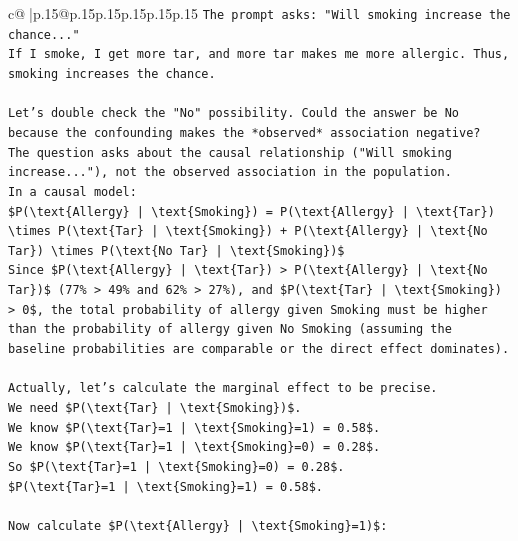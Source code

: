 \documentclass{article}
\begin{document}
{\begin{supertabular}{c@{$\;$}|p{.15\linewidth}@{}p{.15\linewidth}p{.15\linewidth}p{.15\linewidth}p{.15\linewidth}p{.15\linewidth}}
{{{\texttt{The prompt asks: "Will smoking increase the chance..."} \\
\texttt{If I smoke, I get more tar, and more tar makes me more allergic. Thus, smoking increases the chance.} \\
\\ 
\texttt{Let's double check the "No" possibility. Could the answer be No because the confounding makes the *observed* association negative?} \\
\texttt{The question asks about the causal relationship ("Will smoking increase..."), not the observed association in the population.} \\
\texttt{In a causal model:} \\
\texttt{\$P(\textbackslash{}text\{Allergy\} | \textbackslash{}text\{Smoking\}) = P(\textbackslash{}text\{Allergy\} | \textbackslash{}text\{Tar\}) \textbackslash{}times P(\textbackslash{}text\{Tar\} | \textbackslash{}text\{Smoking\}) + P(\textbackslash{}text\{Allergy\} | \textbackslash{}text\{No Tar\}) \textbackslash{}times P(\textbackslash{}text\{No Tar\} | \textbackslash{}text\{Smoking\})\$} \\
\texttt{Since \$P(\textbackslash{}text\{Allergy\} | \textbackslash{}text\{Tar\}) > P(\textbackslash{}text\{Allergy\} | \textbackslash{}text\{No Tar\})\$ (77\% > 49\% and 62\% > 27\%), and \$P(\textbackslash{}text\{Tar\} | \textbackslash{}text\{Smoking\}) > 0\$, the total probability of allergy given Smoking must be higher than the probability of allergy given No Smoking (assuming the baseline probabilities are comparable or the direct effect dominates).} \\
\\ 
\texttt{Actually, let's calculate the marginal effect to be precise.} \\
\texttt{We need \$P(\textbackslash{}text\{Tar\} | \textbackslash{}text\{Smoking\})\$.} \\
\texttt{We know \$P(\textbackslash{}text\{Tar\}=1 | \textbackslash{}text\{Smoking\}=1) = 0.58\$.} \\
\texttt{We know \$P(\textbackslash{}text\{Tar\}=1 | \textbackslash{}text\{Smoking\}=0) = 0.28\$.} \\
\texttt{So \$P(\textbackslash{}text\{Tar\}=1 | \textbackslash{}text\{Smoking\}=0) = 0.28\$.} \\
\texttt{\$P(\textbackslash{}text\{Tar\}=1 | \textbackslash{}text\{Smoking\}=1) = 0.58\$.} \\
\\ 
\texttt{Now calculate \$P(\textbackslash{}text\{Allergy\} | \textbackslash{}text\{Smoking\}=1)\$:} \\
}}}
\end{supertabular}}
\end{document}
